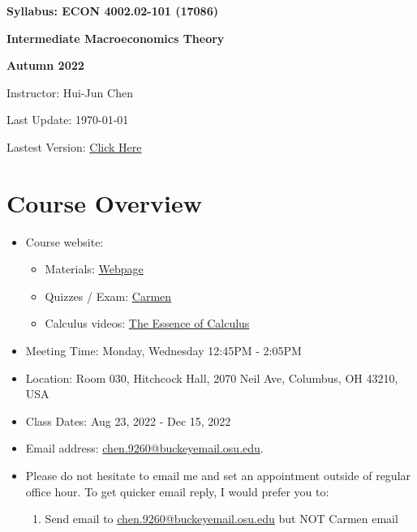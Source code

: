 \documentclass[12pt]{article}
\begin{document}
\centerline{\huge\bf Syllabus: ECON 4002.02-101 (17086)}
\medskip
\centerline{\LARGE \bf Intermediate Macroeconomics Theory}
\medskip
\centerline{\LARGE \bf Autumn 2022}
\medskip
\centerline{\Large Instructor: Hui-Jun Chen}
\centerline{Last Update: \today}
\centerline{Lastest Version: \href{https://huijunchen9260.github.io/pdf/IntermediateMacroAutumn2022/syllabus/build/syllabus.pdf}{Click Here}}

\medskip

\section*{Course Overview}
\begin{itemize}

    \item Course website:
    \begin{itemize}
        \item Materials: \href{https://huijunchen9260.github.io/IntermediateMacroAutumn2022.html}{Webpage}
        \item Quizzes / Exam: \href{https://osu.instructure.com/courses/127406}{Carmen}
        \item Calculus videos: \href{https://www.youtube.com/watch?v=WUvTyaaNkzM&list=PLZHQObOWTQDMsr9K-rj53DwVRMYO3t5Yr}{The Essence of Calculus}
    \end{itemize}
    \item Meeting Time: Monday, Wednesday 12:45PM - 2:05PM
    \item Location: Room 030, Hitchcock Hall, 2070 Neil Ave, Columbus, OH 43210, USA
    \item Class Dates: Aug 23, 2022 - Dec 15, 2022
    \item Email address: \href{chen.9260@buckeyemail.osu.edu}{chen.9260@buckeyemail.osu.edu}.
    \item Please do not hesitate to email me and set an appointment outside of regular office hour. To get quicker email reply, I would prefer you to:
    \begin{enumerate}
        \item Send email to \href{chen.9260@buckeyemail.osu.edu}{chen.9260@buckeyemail.osu.edu} but NOT Carmen email

\end{enumerate}
\end{itemize}
\end{document}
